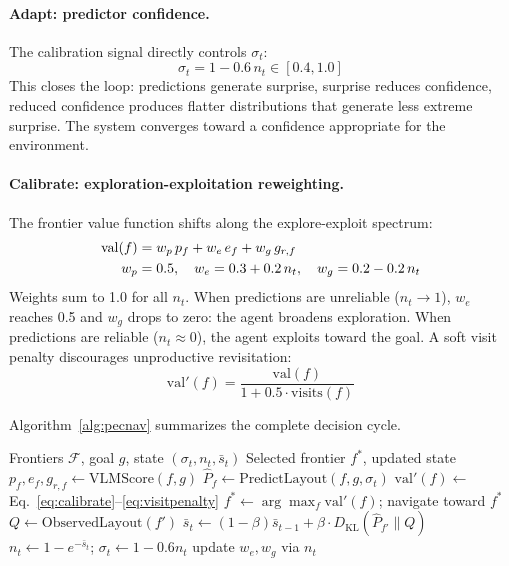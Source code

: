 \paragraph{Adapt: predictor confidence.} The calibration signal directly controls $\sigma_t$:
\begin{equation}
    \sigma_t = 1 - 0.6\, n_t \in [0.4, 1.0]
    \label{eq:adapt}
\end{equation}
This closes the loop: predictions generate surprise, surprise reduces confidence, reduced confidence produces flatter distributions that generate less extreme surprise. The system converges toward a confidence appropriate for the environment.

\paragraph{Calibrate: exploration-exploitation reweighting.} The frontier value function shifts along the explore-exploit spectrum:
\begin{align}
    \mathrm{val}(f) &= w_p \, p_f + w_e \, e_f + w_g \, g_{r,f} \label{eq:calibrate} \\
    w_p &= 0.5, \quad w_e = 0.3 + 0.2\,n_t, \quad w_g = 0.2 - 0.2\,n_t \notag
\end{align}
Weights sum to 1.0 for all $n_t$. When predictions are unreliable ($n_t \to 1$), $w_e$ reaches 0.5 and $w_g$ drops to zero: the agent broadens exploration. When predictions are reliable ($n_t \approx 0$), the agent exploits toward the goal. A soft visit penalty discourages unproductive revisitation:
\begin{equation}
    \mathrm{val}'(f) = \frac{\mathrm{val}(f)}{1 + 0.5 \cdot \mathrm{visits}(f)}
    \label{eq:visitpenalty}
\end{equation}

Algorithm~\ref{alg:pecnav} summarizes the complete decision cycle.

\begin{algorithm}[H]
\caption{PEC-Nav decision cycle}
\label{alg:pecnav}
\begin{algorithmic}[1]
\REQUIRE Frontiers $\mathcal{F}$, goal $g$, state $(\sigma_t, n_t, \bar{s}_t)$
\ENSURE Selected frontier $f^*$, updated state
    \STATE $p_f, e_f, g_{r,f} \leftarrow \text{VLMScore}(f, g)$
    \STATE $\hat{P}_f \leftarrow \text{PredictLayout}(f, g, \sigma_t)$ 
    \STATE $\mathrm{val}'(f) \leftarrow$ Eq.~\ref{eq:calibrate}--\ref{eq:visitpenalty}
\ENDFOR
\STATE $f^* \leftarrow \arg\max_{f} \mathrm{val}'(f)$; navigate toward $f^*$
    \STATE $Q \leftarrow \text{ObservedLayout}(f')$ 
    \STATE $\bar{s}_t \leftarrow (1{-}\beta)\bar{s}_{t-1} + \beta \cdot D_{\mathrm{KL}}(\hat{P}_{f'} \| Q)$
    \STATE $n_t \leftarrow 1 - e^{-\bar{s}_t}$; \quad $\sigma_t \leftarrow 1 - 0.6 n_t$
    \STATE update $w_e, w_g$ via $n_t$
\ENDIF
\end{algorithmic}
\end{algorithm}

